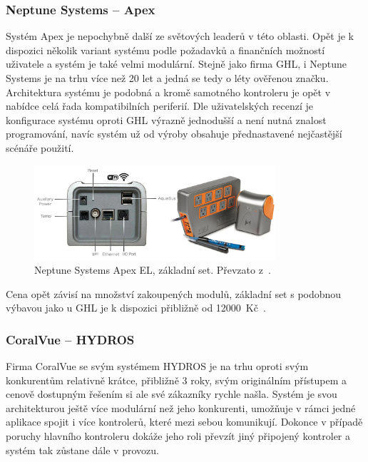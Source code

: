         \subsubsection{Neptune Systems -- Apex}
            Systém Apex je nepochybně další ze světových leaderů v této oblasti. Opět je k dispozici několik variant systému podle požadavků a finančních možností uživatele a systém je také velmi modulární. Stejně jako firma GHL, i Neptune Systems je na trhu více než 20 let a jedná se tedy o léty ověřenou značku. Architektura systému je podobná a kromě samotného kontroleru je opět v nabídce celá řada kompatibilních periferií. Dle uživatelských recenzí je konfigurace systému oproti GHL výrazně jednodušší a není nutná znalost programování, navíc systém už od výroby obsahuje přednastavené nejčastější scénáře použití.

            \begin{figure}[h!]
                \centering
                \includegraphics[width=0.8\textwidth]{obrazky/trh/apex-el.jpg}
                \caption{Neptune Systems Apex EL, základní set. Převzato z~\cite{eshop-neptune-systems-apex}.}
                \label{fig:obrazky-trh-apex-el}
            \end{figure}
            
            Cena opět závisí na množství zakoupených modulů, základní set s podobnou výbavou jako u GHL je k dispozici přibližně od \qty{12000}{Kč}~\cite{neptune-systems-why-apex,eshop-neptune-systems-apex}.

        \subsubsection{CoralVue -- HYDROS}
            Firma CoralVue se svým systémem HYDROS je na trhu oproti svým konkurentům relativně krátce, přibližně 3 roky, svým originálním přístupem a cenově dostupným řešením si ale své zákazníky rychle našla. Systém je svou architekturou ještě více modulární než jeho konkurenti, umožňuje v rámci jedné aplikace spojit i více kontrolerů, které mezi sebou komunikují. Dokonce v případě poruchy hlavního kontroleru dokáže jeho roli převzít jiný připojený kontroler a systém tak zůstane dále v provozu. 
            
